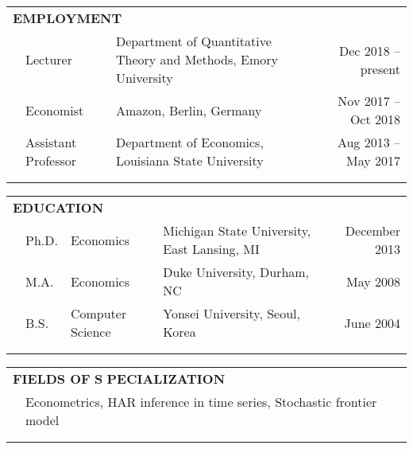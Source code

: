 \documentclass[10pt]{article}
\begin{document}
\begin{center}
\bigskip \bigskip
\begin{tabular}{llllr}
\multicolumn{5}{l}{{\Large \textbf{E}}\textbf{MPLOYMENT}} \vspace{0.1cm}\\
&\multicolumn{1}{l}{Lecturer} & \multicolumn{2}{l}{Department of Quantitative Theory and Methods, Emory University}& \multicolumn{1}{r}{Dec 2018 -- present}\vspace{0.1cm} \\
&\multicolumn{1}{l}{Economist} & \multicolumn{2}{l}{Amazon, Berlin, Germany}& \multicolumn{1}{r}{Nov 2017 -- Oct 2018}\vspace{0.1cm} \\
&\multicolumn{1}{l}{Assistant Professor} &\multicolumn{2}{l}{Department of Economics, Louisiana State University}& \multicolumn{1}{r}{Aug 2013 -- May 2017} \\
\multicolumn{5}{p{500pt}}{}\\\\
\end{tabular}
\begin{tabular}{llllr}
\multicolumn{5}{l}{{\Large \textbf{E}}\textbf{DUCATION}} \vspace{0.1cm}\\
&\multicolumn{1}{l}{Ph.D.} & \multicolumn{1}{l}{Economics}&\multicolumn{1}{l}{Michigan State University, East Lansing, MI}& \multicolumn{1}{r}{December 2013} \\
&\multicolumn{1}{l}{M.A.} & \multicolumn{1}{l}{Economics}& \multicolumn{1}{l}{Duke University, Durham, NC} & \multicolumn{1}{r}{May 2008} \\
&\multicolumn{1}{l}{B.S.} & \multicolumn{1}{l}{Computer Science}& \multicolumn{1}{l}{Yonsei University, Seoul, Korea} & \multicolumn{1}{r}{June 2004} \\
\multicolumn{5}{p{500pt}}{}\\\\
\end{tabular}
\begin{tabular}{llllr}
\multicolumn{5}{l}{{\Large \textbf{F}}\textbf{IELDS OF} {\Large \textbf{S}}%
\textbf{PECIALIZATION}} \vspace{0.1cm}\\
& \multicolumn{4}{l}{Econometrics, HAR inference in time series, Stochastic frontier model} \\
\multicolumn{5}{p{500pt}}{}\\\\
\end{tabular}
\begin{tabular}{llllr}

\end{tabular}
\end{center}
\end{document}
